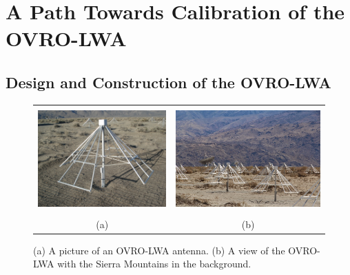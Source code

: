 \chapter{A Path Towards Calibration of the OVRO-LWA}

\section{Design and Construction of the OVRO-LWA}

\begin{bibunit}

\begin{figure}[t]
    \centering
    \begin{tabular}{cc}
        \includegraphics[height=4cm]{figures/chapter2/lwa-antenna} &
        \includegraphics[height=4cm]{figures/chapter2/ovro-lwa} \\
        (a) & (b) \\
    \end{tabular}
    \caption{
        (a) A picture of an OVRO-LWA antenna.
        (b) A view of the OVRO-LWA with the Sierra Mountains in the background.
    }
    \label{fig:ovro-lwa-pictures}
\end{figure}


\end{bibunit}
